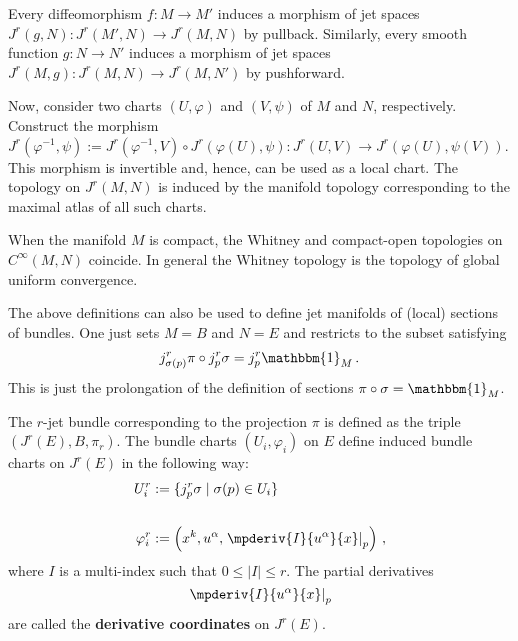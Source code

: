    \begin{property}[Topology]
        Every diffeomorphism $f:M\rightarrow M'$ induces a morphism of jet spaces $J^r(g,N):J^r(M',N)\rightarrow J^r(M,N)$ by pullback. Similarly, every smooth function $g:N\rightarrow N'$ induces a morphism of jet spaces $J^r(M,g):J^r(M,N)\rightarrow J^r(M,N')$ by pushforward.

        Now, consider two charts $(U,\varphi)$ and $(V,\psi)$ of $M$ and $N$, respectively. Construct the morphism $J^r(\varphi^{-1},\psi):=J^r(\varphi^{-1},V)\circ J^r(\varphi(U),\psi):J^r(U,V)\rightarrow J^r(\varphi(U),\psi(V))$. This morphism is invertible and, hence, can be used as a local chart. The topology on $J^r(M,N)$ is induced by the manifold topology corresponding to the maximal atlas of all such charts.
    \end{property}
    \begin{property}
        When the manifold $M$ is compact, the Whitney and compact-open topologies on $C^\infty(M,N)$ coincide. In general the Whitney topology is the topology of global uniform convergence.
    \end{property}

    \begin{remark}
        The above definitions can also be used to define jet manifolds of (local) sections of bundles. One just sets $M=B$ and $N=E$ and restricts to the subset satisfying
        \begin{gather}
            j^r_{\sigma(p)}\pi\circ j^r_p\sigma=j^r_p\mathbbm{1}_M\,.
        \end{gather}
        This is just the prolongation of the definition of sections $\pi\circ\sigma=\mathbbm{1}_M$.

        The $r$-jet bundle corresponding to the projection $\pi$ is defined as the triple $(J^r(E),B,\pi_r)$. The bundle charts $(U_i,\varphi_i)$ on $E$ define induced bundle charts on $J^r(E)$ in the following way:
        \begin{align}
            U_i^r &:= \{j_p^r\sigma\mid\sigma(p)\in U_i\}\,\\\nonumber\\
            \varphi_i^r &:= \left(x^k,u^\alpha,\left.\mpderiv{I}{u^\alpha}{x}\right|_p\right)\,,
        \end{align}
        where $I$ is a multi-index such that $0\leq|I|\leq r$. The partial derivatives \[\left.\mpderiv{I}{u^\alpha}{x}\right|_p\] are called the \textbf{derivative coordinates} on $J^r(E)$.
    \end{remark}

